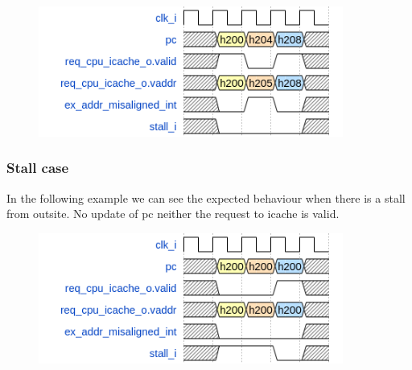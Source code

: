 \begin{figure}[H]
\centering
\includegraphics[width=10cm]{Figure/misaligned.png}
\end{figure}

\subsubsection{Stall case}
In the following example we can see the expected behaviour when there is a stall from outsite. No update of pc neither the request to icache is valid.

\begin{figure}[H]
\centering
\includegraphics[width=10cm]{Figure/stall.png}
\end{figure}

